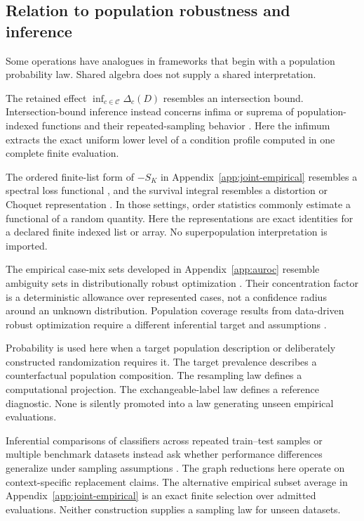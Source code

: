 \documentclass[11pt]{article}
\newcommand{\CSet}{\mathcal{C}}
\theoremstyle{remark}
\begin{document}
\subsection{Relation to population robustness and inference}
\label{sec:related-frameworks}

Some operations have analogues in frameworks that begin with a population
probability law. Shared algebra does not supply a shared interpretation.

The retained effect $\inf_{c\in\CSet}\Delta_c(D)$ resembles an intersection
bound. Intersection-bound inference instead concerns infima or suprema of
population-indexed functions and their repeated-sampling behavior
\cite{chernozhukov2013intersection}. Here the infimum extracts the exact uniform
lower level of a condition profile computed in one complete finite evaluation.

The ordered finite-list form of $-S_K$ in Appendix~\ref{app:joint-empirical}
resembles a spectral loss functional
\cite{acerbi2002spectral}, and the survival integral resembles a distortion or
Choquet representation \cite{wang1996premium}. In those settings, order
statistics commonly estimate a functional of a random quantity. Here the
representations are exact identities for a declared finite indexed list or
array. No superpopulation interpretation is imported.

The empirical case-mix sets developed in Appendix~\ref{app:auroc} resemble
ambiguity sets in distributionally robust optimization
\cite{shapiro2017distributionally,bental2013robust}. Their concentration factor
is a deterministic allowance over represented cases, not a confidence radius
around an unknown distribution. Population coverage results from data-driven
robust optimization require a different inferential target and assumptions
\cite{duchi2021statistics}.

Probability is used here when a target population description or deliberately
constructed randomization requires it. The target prevalence describes a
counterfactual population composition. The resampling law defines a
computational projection. The exchangeable-label law defines a reference
diagnostic. None is silently promoted into a law generating unseen empirical
evaluations.

Inferential comparisons of classifiers across repeated train--test samples or
multiple benchmark datasets instead ask whether performance differences
generalize under sampling assumptions
\cite{nadeau2003inference,bouckaert2004estimating,demsar2006statistical}. The graph reductions here operate on context-specific replacement claims.
The alternative empirical subset average in Appendix~\ref{app:joint-empirical}
is an exact finite selection over admitted evaluations. Neither construction
supplies a sampling law for unseen datasets.
\end{document}
